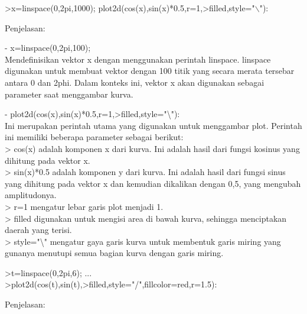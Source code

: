 \documentclass[a4paper,10pt]{article}
\begin{document}
\begin{eulernotebook}
\begin{eulercomment}
\begin{eulercomment}
\begin{eulercomment}
\begin{eulercomment}
\begin{eulercomment}
\begin{eulercomment}
\begin{eulercomment}
\begin{eulercomment}
\begin{eulercomment}
\begin{eulercomment}
\begin{eulercomment}
\begin{eulercomment}
\begin{eulercomment}
\end{eulercomment}
\begin{eulerprompt}
>x=linspace(0,2pi,1000); plot2d(cos(x),sin(x)*0.5,r=1,>filled,style="\(\backslash\)"):
\end{eulerprompt}
\begin{eulercomment}
Penjelasan:

- x=linspace(0,2pi,100);\\
Mendefinisikan vektor x dengan menggunakan perintah linspace. linspace
digunakan untuk membuat vektor dengan 100 titik yang secara merata
tersebar antara 0 dan 2phi. Dalam konteks ini, vektor x akan digunakan
sebagai parameter saat menggambar kurva.

- plot2d(cos(x),sin(x)*0.5,r=1,\textgreater{}filled,style="\textbackslash{}"):\\
Ini merupakan perintah utama yang digunakan untuk menggambar plot.
Perintah ini memiliki beberapa parameter sebagai berikut:\\
\textgreater{} cos(x) adalah komponen x dari kurva. Ini adalah hasil dari fungsi
kosinus yang dihitung pada vektor x.\\
\textgreater{} sin(x)*0.5 adalah komponen y dari kurva. Ini adalah hasil dari
fungsi sinus yang dihitung pada vektor x dan kemudian dikalikan dengan
0,5, yang mengubah amplitudonya.\\
\textgreater{} r=1 mengatur lebar garis plot menjadi 1.\\
\textgreater{} filled digunakan untuk mengisi area di bawah kurva, sehingga
menciptakan daerah yang terisi.\\
\textgreater{} style="\textbackslash{}" mengatur gaya garis kurva untuk membentuk garis miring
yang gunanya menutupi semua bagian kurva dengan garis miring.

\end{eulercomment}
\begin{eulerprompt}
>t=linspace(0,2pi,6); ...
>plot2d(cos(t),sin(t),>filled,style="/",fillcolor=red,r=1.5):
\end{eulerprompt}
\begin{eulercomment}
Penjelasan:


\end{eulercomment}
\end{eulercomment}
\end{eulercomment}
\end{eulercomment}
\end{eulercomment}
\end{eulercomment}
\end{eulercomment}
\end{eulercomment}
\end{eulercomment}
\end{eulercomment}
\end{eulercomment}
\end{eulercomment}
\end{eulercomment}
\end{eulernotebook}
\end{document}
